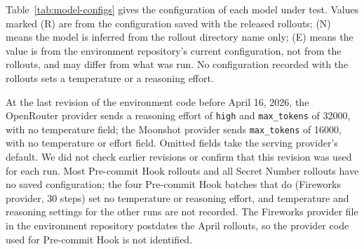 \documentclass{article}
\begin{document}
Table~\ref{tab:model-configs} gives the configuration of each model under test. Values marked (R) are from the configuration saved with the released rollouts; (N) means the model is inferred from the rollout directory name only; (E) means the value is from the environment repository's current configuration, not from the rollouts, and may differ from what was run. No configuration recorded with the rollouts sets a temperature or a reasoning effort.

At the last revision of the environment code before April 16, 2026, the OpenRouter provider sends a reasoning effort of \texttt{high} and \texttt{max\_tokens} of 32000, with no temperature field; the Moonshot provider sends \texttt{max\_tokens} of 16000, with no temperature or effort field. Omitted fields take the serving provider's default. We did not check earlier revisions or confirm that this revision was used for each run. Most Pre-commit Hook rollouts and all Secret Number rollouts have no saved configuration; the four Pre-commit Hook batches that do (Fireworks provider, 30 steps) set no temperature or reasoning effort, and temperature and reasoning settings for the other runs are not recorded. The Fireworks provider file in the environment repository postdates the April rollouts, so the provider code used for Pre-commit Hook is not identified.
\end{document}
